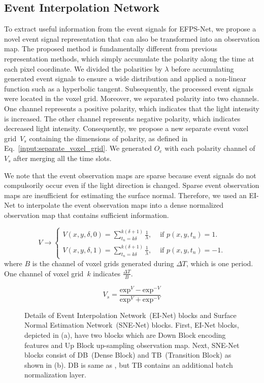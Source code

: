 \subsection{Event Interpolation Network}
To extract useful information from the event signals for EFPS-Net, we propose a novel event signal representation that can also be transformed into an observation map.
The proposed method is fundamentally different from previous representation methods, which simply accumulate the polarity along the time at each pixel coordinate.
We divided the polarities by $\lambda$ before accumulating generated event signals to ensure a wide distribution and applied a non-linear function such as a hyperbolic tangent.
Subsequently, the processed event signals were located in the voxel grid.
Moreover, we separated polarity into two channels.
One channel represents a positive polarity, which indicates that the light intensity is increased. 
The other channel represents negative polarity, which indicates decreased light intensity.
Consequently, we propose a new separate event voxel grid~$V_{s}$ containing the dimensions of polarity, as defined in Eq.~{\ref{input:separate_voxel_grid}}.
We generated $O_{e}$ with each polarity channel of $V_{s}$ after merging all the time slots.

We note that the event observation maps are sparse because event signals do not compulsorily occur even if the light direction is changed.
Sparse event observation maps are insufficient for estimating the surface normal.
Therefore, we used an EI-Net to interpolate the event observation maps into a dense normalized observation map that contains sufficient information.

$$
V\rightarrow \begin{cases}
V(x,y,\delta,0) = \sum^{k(\delta+1)}_{t_{n}=k\delta}{\frac{1}{\lambda}}, & \text{ if } p(x,y,t_{n})=1. \\
V(x,y,\delta,1) = \sum^{k(\delta+1)}_{t_{n}=k\delta}{\frac{1}{\lambda}}, & \text{ if } p(x,y,t_{n})=-1.
\end{cases}
$$
where $B$ is the channel of voxel grids generated during $\Delta T$, which is one period. One channel of voxel grid~$k$ indicates $\frac{\Delta T}{B}$.


\begin{equation}
V_{s} = \frac{\text{exp}^{V}-\text{exp}^{-V}}{\text{exp}^{V}+\text{exp}^{-V}}
\label{input:separate_voxel_grid}
\end{equation}

\begin{figure}[t]
    \centering
    \caption{Details of Event Interpolation Network~(EI-Net) blocks and Surface Normal Estimation Network~(SNE-Net) blocks. First, EI-Net blocks, depicted in (a), have two blocks which are Down Block encoding features and Up Block up-sampling observation map. Next, SNE-Net blocks consist of DB~(Dense Block) and TB~(Transition Block) as shown in (b). DB is same as \citep{logothetis2021px}, but TB contains an additional batch normalization layer.}
    \label{fig:blocks}
\end{figure}

